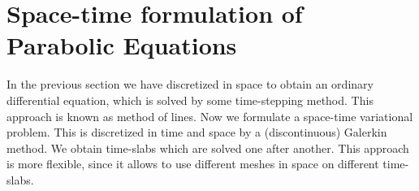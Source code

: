 








% 

\section{Space-time formulation of Parabolic Equations}

In the previous section we have discretized in space to obtain an ordinary differential equation, which 
is solved by some time-stepping method. This approach is known as method of lines.
Now we formulate a space-time variational problem. This is discretized in time and space
by a (discontinuous) Galerkin method. We obtain time-slabs which are solved one after another.
This approach is more flexible, since it allows to use different meshes in space on different time-slabs.

